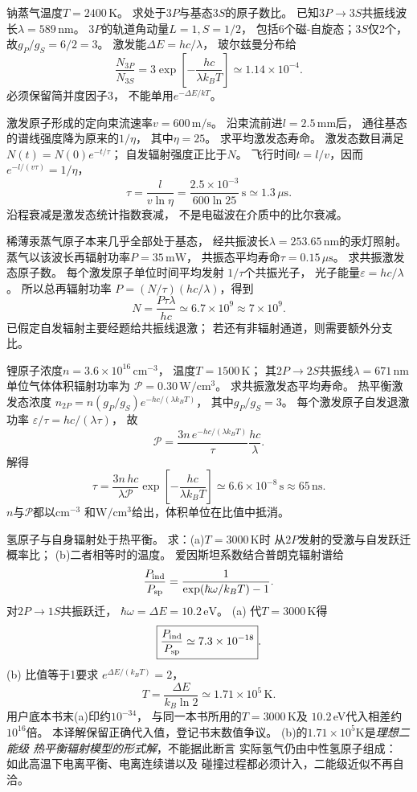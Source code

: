 钠蒸气温度$T=2400\,\mathrm K$。
求处于$3P$与基态$3S$的原子数比。
已知$3P\to3S$共振线波长$\lambda=589\,\mathrm{nm}$。
\exsolution
$3P$的轨道角动量$L=1,S=1/2$，
包括6个磁-自旋态；$3S$仅2个，
故$g_P/g_S=6/2=3$。
激发能$\Delta E=hc/\lambda$，
玻尔兹曼分布给
\[
 \boxed{\frac{N_{3P}}{N_{3S}}=
 3\exp\!\left[-\frac{hc}{\lambda k_BT}\right]
 \simeq1.14\times10^{-4}}.
\]
\excheck 必须保留简并度因子3，
不能单用$e^{-\Delta E/kT}$。

激发原子形成的定向束流速率$v=600\,\mathrm{m/s}$。
沿束流前进$l=2.5\,\mathrm{mm}$后，
通往基态的谱线强度降为原来的$1/\eta$，
其中$\eta=25$。
求平均激发态寿命。
\exsolution
激发态数目满足
$N(t)=N(0)e^{-t/\tau}$；
自发辐射强度正比于$N$。
飞行时间$t=l/v$，因而
$e^{-l/(v\tau)}=1/\eta$，
\[
 \boxed{\tau=\frac l{v\ln\eta}
 =\frac{2.5\times10^{-3}}
 {600\ln25}\,\mathrm s\simeq1.3\,\mu\mathrm s}.
\]
\excheck 沿程衰减是激发态统计指数衰减，
不是电磁波在介质中的比尔衰减。

稀薄汞蒸气原子本来几乎全部处于基态，
经共振波长$\lambda=253.65\,\mathrm{nm}$的汞灯照射。
蒸气以该波长再辐射功率$P=35\,\mathrm{mW}$，
共振态平均寿命$\tau=0.15\,\mu\mathrm s$。
求共振激发态原子数。
\exsolution
每个激发原子单位时间平均发射
$1/\tau$个共振光子，
光子能量$\varepsilon=hc/\lambda$。
所以总再辐射功率
$P=(N/\tau)(hc/\lambda)$，得到
\[
 \boxed{N=\frac{P\tau\lambda}{hc}
 \simeq6.7\times10^{9}\approx7\times10^9}.
\]
\excheck 已假定自发辐射主要经题给共振线退激；
若还有非辐射通道，则需要额外分支比。

锂原子浓度$n=3.6\times10^{16}\,\mathrm{cm^{-3}}$，
温度$T=1500\,\mathrm K$；
其$2P\to2S$共振线$\lambda=671\,\mathrm{nm}$
单位气体体积辐射功率为
$\mathcal P=0.30\,\mathrm{W/cm^3}$。
求共振激发态平均寿命。
\exsolution
热平衡激发态浓度
$n_{2P}=n(g_P/g_S)e^{-hc/(\lambda k_BT)}$，
其中$g_P/g_S=3$。
每个激发原子自发退激功率
$\varepsilon/\tau=hc/(\lambda\tau)$，
故
\[
 \mathcal P=
 \frac{3n\,e^{-hc/(\lambda k_BT)}}{\tau}
 \frac{hc}{\lambda}.
\]
解得
\[
 \boxed{\tau=
 \frac{3n\,hc}{\lambda\mathcal P}
 \exp\!\left[-\frac{hc}{\lambda k_BT}\right]
 \simeq6.6\times10^{-8}\,\mathrm s
 \approx65\,\mathrm{ns}}.
\]
\excheck $n$与$\mathcal P$都以$\mathrm{cm^{-3}}$
和$\mathrm{W/cm^3}$给出，体积单位在比值中抵消。

氢原子与自身辐射处于热平衡。
求：(a)$T=3000\,\mathrm K$时
从$2P$发射的受激与自发跃迁概率比；
(b)二者相等时的温度。
\exsolution
爱因斯坦系数结合普朗克辐射谱给
\[
 \frac{P_{\rm ind}}{P_{\rm sp}}=
 \frac1{\exp(\hbar\omega/k_BT)-1}.
\]
对$2P\to1S$共振跃迁，
$\hbar\omega=\Delta E=10.2\,\mathrm{eV}$。
(a) 代$T=3000\,\mathrm K$得
\[
 \boxed{\frac{P_{\rm ind}}{P_{\rm sp}}
 \simeq7.3\times10^{-18}}.
\]
(b) 比值等于1要求
$e^{\Delta E/(k_BT)}=2$，
\[
 \boxed{T=\frac{\Delta E}{k_B\ln2}
 \simeq1.71\times10^5\,\mathrm K}.
\]
\excheck 用户底本书末(a)印约$10^{-34}$，
与同一本书所用的$T=3000\,$K及
$10.2\,$eV代入相差约$10^{16}$倍。
本译解保留正确代入值，登记书末数值争议。
(b)的$1.71\times10^5$K是\emph{理想二能级
热平衡辐射模型的形式解}，不能据此断言
实际氢气仍由中性氢原子组成：
如此高温下电离平衡、电离连续谱以及
碰撞过程都必须计入，二能级近似不再自洽。

